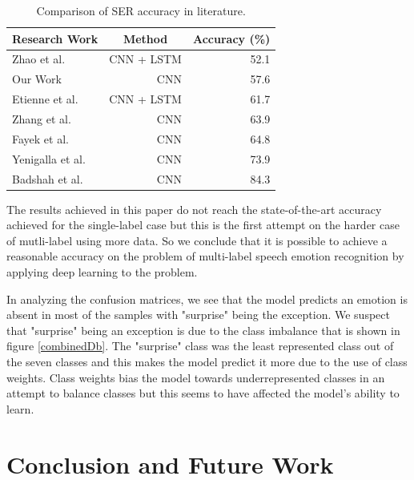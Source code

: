 \documentclass[conference]{IEEEtran}
\begin{document}
\bgroup
\def\arraystretch{2}
\begin{table}[]
	\centering
	\caption{Comparison of SER accuracy in literature.}
	\label{litacccompare}
	\begin{tabular}{|l|r|r|}
		\hline
		\multicolumn{1}{|c|}{\textbf{Research Work}} & \multicolumn{1}{c|}{\textbf{Method}} & \multicolumn{1}{c|}{\textbf{Accuracy (\%)}} \\ \hline
		\rowcolor[HTML]{F6F8FA}
		Zhao et al. \cite{Zhao2019} & CNN + LSTM & 52.1 \\ \hline
		Our Work & CNN & 57.6 \\ \hline
		\rowcolor[HTML]{F6F8FA}
		Etienne et al. \cite{Etienne2018} & CNN + LSTM & 61.7 \\ \hline
		Zhang et al. \cite{Zhang2019} & CNN & 63.9 \\ \hline
		\rowcolor[HTML]{F6F8FA}
		Fayek et al. \cite{Fayek2017} & CNN & 64.8 \\ \hline
		Yenigalla et al. \cite{Yenigalla2018} & CNN & 73.9 \\ \hline
		\rowcolor[HTML]{F6F8FA}
		Badshah et al. \cite {Badshah2019} & CNN & 84.3 \\ \hline
	\end{tabular}
\end{table}
\egroup

The results achieved in this paper do not reach the state-of-the-art accuracy achieved for the single-label case but this is the first attempt on the harder case of mutli-label using more data. So we conclude that it is possible to achieve a reasonable accuracy on the problem of multi-label speech emotion recognition by applying deep learning to the problem. 

In analyzing the confusion matrices, we see that the model predicts an emotion is absent in most of the samples with "surprise" being the exception. We suspect that "surprise" being an exception is due to the class imbalance that is shown in figure \ref{combinedDb}. The "surprise" class was the least represented class out of the seven classes and this makes the model predict it more due to the use of class weights. Class weights bias the model towards underrepresented classes in an attempt to balance classes but this seems to have affected the model's ability to learn.

\section{Conclusion and Future Work}
\end{document}
